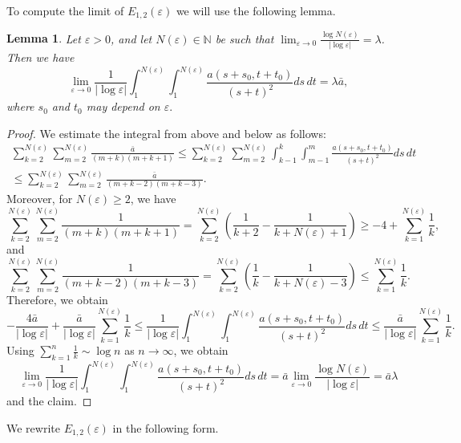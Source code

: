 \documentclass[12pt]{article}
\newtheorem{lemma}[definition]{Lemma}
\newcommand{\N}{\mathbb{N}}
\numberwithin{equation}{section}
\def\N{\mathbb N}
\begin{document}
To compute the limit of $E_{1,2}(\varepsilon)$ we will use the following lemma.
\begin{lemma}\label{harmonic sum lemma}
    Let $\varepsilon>0$, and let $N(\varepsilon)\in\N$ be such that
    $\displaystyle\lim_{\varepsilon\to0}\frac{\log{N(\varepsilon)}}{|\log{\varepsilon}|}=\lambda$.
    Then we have
    \[
    \lim_{\varepsilon\to0}\frac{1}{|\log{\varepsilon}|}\int_{1}^{N(\varepsilon)}\int_{1}^{N(\varepsilon)}\frac{a(s+s_{0},t+t_{0})}{(s+t)^{2}}ds\,dt=\lambda\bar{a},
    \]
    where $s_{0}$ and $t_{0}$ may depend on $\varepsilon.$
\end{lemma}
\begin{proof}
    We estimate the integral from above and below as follows:
\begin{multline*}
  \sum_{k=2}^{N(\varepsilon)}\sum_{m=2}^{N(\varepsilon)}\frac{\bar{a}}{(m+k)(m+k+1)}\le\sum_{k=2}^{N(\varepsilon)}\sum_{m=2}^{N(\varepsilon)}\int_{k-1}^{k}\int_{m-1}^{m}\frac{a\left(s+s_{0},t+t_{0}\right)}{(s+t)^2}ds\,dt\\\le\sum_{k=2}^{N(\varepsilon)}\sum_{m=2}^{N(\varepsilon)}\frac{\bar{a}}{(m+k-2)(m+k-3)}.
\end{multline*}
Moreover, for $N(\varepsilon)\ge2$, we have 
\[
\sum_{k=2}^{N(\varepsilon)}\sum_{m=2}^{N(\varepsilon)}\frac{1}{(m+k)(m+k+1)}=\sum_{k=2}^{N(\varepsilon)}\left(\frac{1}{k+2}-\frac{1}{k+N(\varepsilon)+1}\right)\ge-4+\sum_{k=1}^{N(\varepsilon)}\frac{1}{k},
\]
and
\[
\sum_{k=2}^{N(\varepsilon)}\sum_{m=2}^{N(\varepsilon)}\frac{1}{(m+k-2)(m+k-3)}=\sum_{k=2}^{N(\varepsilon)}\left(\frac{1}{k}-\frac{1}{k+N(\varepsilon)-3}\right)\le\sum_{k=1}^{N(\varepsilon)}\frac{1}{k}.
\]
Therefore, we obtain
\[
-\frac{4\bar{a}}{|\log{\varepsilon}|}+\frac{\bar{a}}{|\log{\varepsilon}|}\sum_{k=1}^{N(\varepsilon)}\frac{1}{k}\le\frac{1}{|\log{\varepsilon}|}\int_{1}^{N(\varepsilon)}\int_{1}^{N(\varepsilon)}\frac{a(s+s_{0},t+t_{0})}{(s+t)^{2}}ds\,dt\le\frac{\bar{a}}{|\log{\varepsilon}|}\sum_{k=1}^{N(\varepsilon)}\frac{1}{k}.
\]
Using
$\sum\limits_{k=1}^{n}\frac{1}{k}\sim\log{n}$ as $n\to\infty$,
we obtain
\[
\lim_{\varepsilon\to0}\frac{1}{|\log{\varepsilon}|}\int_{1}^{N(\varepsilon)}\int_{1}^{N(\varepsilon)}\frac{a(s+s_{0},t+t_{0})}{(s+t)^{2}}ds\,dt=\bar{a} \lim_{\varepsilon\to0}\frac{\log{N(\varepsilon)}}{|\log{\varepsilon}|}=\bar{a}\lambda
\]
and the claim.
\end{proof}
We rewrite $E_{1,2}(\varepsilon)$ in the following form.
\end{document}
